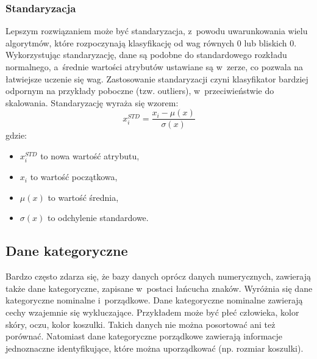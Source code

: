 \subsubsection{Standaryzacja}
Lepszym rozwiązaniem może być standaryzacja, z~powodu uwarunkowania wielu algorytmów, które rozpoczynają klasyfikację od wag równych 0 lub bliskich 0. Wykorzystując standaryzację, dane są podobne do standardowego rozkładu normalnego, a~średnie wartości atrybutów ustawiane są w~zerze, co pozwala na łatwiejsze uczenie się wag. Zastosowanie standaryzacji czyni klasyfikator bardziej odpornym na przykłady poboczne (tzw. outliers), w~przeciwieństwie do skalowania. Standaryzację wyraża się wzorem:
\[x_i^{STD} = \frac{x_i - \mu(x)}{\sigma(x)}\]
gdzie:
\begin{itemize}
	\item $x_i^{STD}$ to nowa wartość atrybutu,
	\item $x_i$ to wartość początkowa,
	\item $\mu(x)$ to wartość średnia,
	\item $\sigma(x)$ to odchylenie standardowe.
\end{itemize}
\subsection{Dane kategoryczne}
Bardzo często zdarza się, że bazy danych oprócz danych numerycznych, zawierają także dane kategoryczne, zapisane w~postaci łańcucha znaków. Wyróżnia się dane kategoryczne nominalne i~porządkowe. Dane kategoryczne nominalne zawierają cechy wzajemnie się wykluczające. Przykładem może być płeć człowieka, kolor skóry, oczu, kolor koszulki. Takich danych nie można posortować ani też porównać. Natomiast dane kategoryczne porządkowe zawierają informacje jednoznaczne identyfikujące, które można uporządkować (np. rozmiar koszulki).

